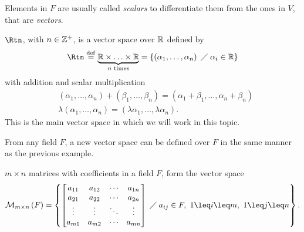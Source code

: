 
\begin{notation}
Elements in $F$ are usually called \textit{scalars} to differentiate them from the ones in $V$, that are
\textit{vectors}.
\end{notation}

\begin{example}
    $\Rtn$, with $n\in\mathbb{Z}^+$, is a vector space over $\mathbb{R}$ defined by
    \begin{equation}
        \Rtn\bydef \underbrace{\R\times\ldots\times\R}_{n \textrm{ times}} = \{\left( \alpha_1, \ldots,
    \alpha_n \right)\st \alpha_i\in\R\}
    \end{equation}
    with addition and scalar multiplication
    \begin{align}
        &\left( \alpha_1, \ldots, \alpha_n \right) + \left( \beta_1, \ldots, \beta_n \right) = \left( \alpha_1          + \beta_1, \ldots, \alpha_n + \beta_n\right) \\
        &\lambda\left( \alpha_1, \ldots, \alpha_n \right) = \left( \lambda\alpha_1, \ldots, \lambda\alpha_n
        \right).
    \end{align}
    This is the main vector space in which we will work in this topic.
\end{example}

From any field $F$, a new vector space can be defined over $F$ in the same manner as the previous example.

\begin{example}
    $m\times n$ matrices with coefficients in a field $F$, form the vector space
    \begin{equation}
        \mathcal{M}_{m\times n}\left( F \right) = \left\{
            \begin{bmatrix}
                a_{11} & a_{12} & \cdots & a_{1n} \\
                a_{21} & a_{22} & \cdots & a_{2n} \\
                \vdots & \vdots & \ddots & \vdots \\
                a_{m1} & a_{m2} & \cdots & a_{mn}
            \end{bmatrix} \st a_{ij}\in F,\ 1 \leq i \leq m,\ 1\leq j\leq n
        \right\}.
    \end{equation}
\end{example}

